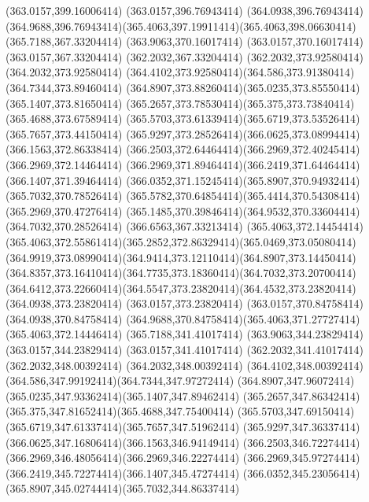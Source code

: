 {{	\lineto(363.0157,399.16006414)
	\lineto(363.0157,396.76943414)
	\lineto(364.0938,396.76943414)
	\curveto(364.9688,396.76943414)(365.4063,397.19911414)(365.4063,398.06630414)
	\closepath
	\moveto(365.7188,367.33204414)
	\lineto(363.9063,370.16017414)
	\lineto(363.0157,370.16017414)
	\lineto(363.0157,367.33204414)
	\lineto(362.2032,367.33204414)
	\lineto(362.2032,373.92580414)
	\lineto(364.2032,373.92580414)
	\curveto(364.4102,373.92580414)(364.586,373.91380414)(364.7344,373.89460414)
	\curveto(364.8907,373.88260414)(365.0235,373.85550414)(365.1407,373.81650414)
	\curveto(365.2657,373.78530414)(365.375,373.73840414)(365.4688,373.67589414)
	\curveto(365.5703,373.61339414)(365.6719,373.53526414)(365.7657,373.44150414)
	\curveto(365.9297,373.28526414)(366.0625,373.08994414)(366.1563,372.86338414)
	\curveto(366.2503,372.64464414)(366.2969,372.40245414)(366.2969,372.14464414)
	\curveto(366.2969,371.89464414)(366.2419,371.64464414)(366.1407,371.39464414)
	\curveto(366.0352,371.15245414)(365.8907,370.94932414)(365.7032,370.78526414)
	\curveto(365.5782,370.64854414)(365.4414,370.54308414)(365.2969,370.47276414)
	\curveto(365.1485,370.39846414)(364.9532,370.33604414)(364.7032,370.28526414)
	\lineto(366.6563,367.33213414)
	\closepath
	\moveto(365.4063,372.14454414)
	\curveto(365.4063,372.55861414)(365.2852,372.86329414)(365.0469,373.05080414)
	\curveto(364.9919,373.08990414)(364.9414,373.12110414)(364.8907,373.14450414)
	\curveto(364.8357,373.16410414)(364.7735,373.18360414)(364.7032,373.20700414)
	\curveto(364.6412,373.22660414)(364.5547,373.23820414)(364.4532,373.23820414)
	\lineto(364.0938,373.23820414)
	\lineto(363.0157,373.23820414)
	\lineto(363.0157,370.84758414)
	\lineto(364.0938,370.84758414)
	\curveto(364.9688,370.84758414)(365.4063,371.27727414)(365.4063,372.14446414)
	\closepath
	\moveto(365.7188,341.41017414)
	\lineto(363.9063,344.23829414)
	\lineto(363.0157,344.23829414)
	\lineto(363.0157,341.41017414)
	\lineto(362.2032,341.41017414)
	\lineto(362.2032,348.00392414)
	\lineto(364.2032,348.00392414)
	\curveto(364.4102,348.00392414)(364.586,347.99192414)(364.7344,347.97272414)
	\curveto(364.8907,347.96072414)(365.0235,347.93362414)(365.1407,347.89462414)
	\curveto(365.2657,347.86342414)(365.375,347.81652414)(365.4688,347.75400414)
	\curveto(365.5703,347.69150414)(365.6719,347.61337414)(365.7657,347.51962414)
	\curveto(365.9297,347.36337414)(366.0625,347.16806414)(366.1563,346.94149414)
	\curveto(366.2503,346.72274414)(366.2969,346.48056414)(366.2969,346.22274414)
	\curveto(366.2969,345.97274414)(366.2419,345.72274414)(366.1407,345.47274414)
	\curveto(366.0352,345.23056414)(365.8907,345.02744414)(365.7032,344.86337414)
}}
